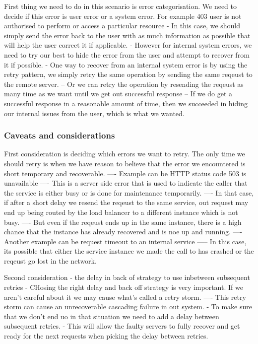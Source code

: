 First thing we need to do in this scenario is error categorisation.
We need to decide if this error is user error or a system error.
For example 403 user is not authorised to perform or access a particular resource
- In this case, we should simply send the error back to the user with as much information as possible that will help the user correct it if applicable.
- However for internal system errors, we need to try our best to hide the error from the user and attempt to recover from it if possible.
- One way to recover from an internal system error is by using the retry pattern, we simply retry the same operation by sending the same reqeust to the remote server.
-- Or we can retry the operation by resending the reqeust as many time as we want until we get out successful response
-- If we do get a successful response in a reasonable amount of time, then we succeeded in hiding our internal issues from the user, which is what we wanted.

\subsubsection{Caveats and considerations}

First consideration is deciding which errors we want to retry.
The only time we should retry is when we have reason to believe that the error we encountered is short temporary and recoverable.
---- Example can be HTTP status code 503 is unavailable
---- This is a server side error that is used to indicate the caller that the service is either busy or is done for maintenance temporarily.
---- In that case, if after a short delay we resend the reqeust to the same service, out request may end up being routed by the load balancer to a different instance which is not busy.
---- But even if the reqeust ends up in the same instance, there is a high chance that the instance has already recovered and is noe up and running.
---- Another example can be request timeout to an internal service
----- In this case, its possible that either the service instance we made the call to has crashed or the reqeust go lost in the network.

Second consideration
- the delay in back of strategy to use inbetween subsequent retries
- CHosing the right delay and back off strategy is very important.
If we aren't careful about it we may cause what's called a retry storm.
---- This retry storm can cause an unrecoverable cascading failure in out system.
- To make sure that we don't end uo in that situation we need to add a delay between subsequent retries.
- This will allow the faulty servers to fully recover and get ready for the next requests when picking the delay between retries.

